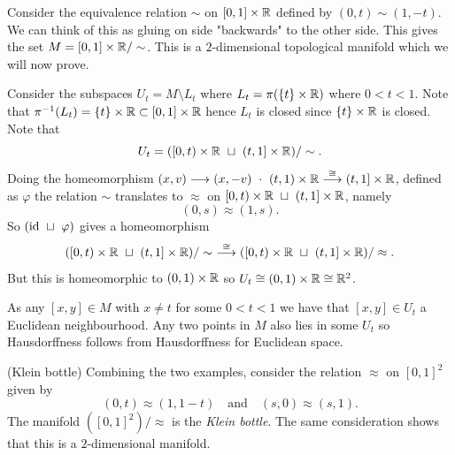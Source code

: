 \documentclass{article}
\begin{document}
\begin{example}
	Consider the equivalence relation $ \sim $ on $ [0,1]\times \mathbb{R} $ defined by $ (0,t)\sim(1,-t) $. We can think of this as gluing on side "backwards" to the other side. This gives the set $ M = [0,1]\times \mathbb{R}/\sim $. This is a $ 2 $-dimensional topological manifold which we will now prove.\par
	Consider the subspaces $ U_t = M\setminus L_t $ where $ L_t = \pi(\{t\}\times \mathbb{R}) $ where $ 0<t<1 $. Note that $ {\pi}^{-1}(L_t)=\{t\}\times \mathbb{R} \subset [0,1]\times \mathbb{R} $ hence $ L_t $ is closed since $ \{t\} \times \mathbb{R} $ is closed. Note that 
	\[U_t = ([0,t) \times \R\ \sqcup\ (t,1]\times \R)/\sim .
	\]
	Doing the homeomorphism $ (x,v)\longrightarrow (x,-v)\ \cdot \  (t,1)\times \mathbb{R}\overset{\cong}{\longrightarrow} (t,1] \times \mathbb{R} $, defined as $ \varphi $ the relation $ \sim $ translates to $ \approx $ on $ [0,t)\times \mathbb{R} \ \sqcup \ (t,1] \times \mathbb{R} $, namely
	\[
		(0,s)\approx(1,s).
	\]
	So $ (\mathrm{id} \ \sqcup \ \varphi) $ gives a homeomorphism
	\[
		([0,t) \times \R \ \sqcup \ (t,1] \times \R)/\sim \ \overset{\cong}{\longrightarrow} ([0,t) \times \R \ \sqcup \ (t,1] \times \R)/\approx.
	\]
But this is homeomorphic to $ (0,1)\times \mathbb{R} $ so $ U_t\cong (0,1)\times \mathbb{R} \cong \mathbb{R}^2 $.\par
As any $ [x,y] \in M $ with $ x\ne t $ for some $ 0<t<1 $ we have that $ [x,y]\in U_t $ a Euclidean neighbourhood. Any two points in $ M $ also lies in some $ U_t $ so Hausdorffness follows from Hausdorffness for Euclidean space.
\end{example}
\begin{example}
	(Klein bottle) Combining the two examples, consider the relation $ \approx $ on $ [0,1]^2 $ given by
	\[
		(0,t)\approx (1,1-t)\quad \text{and}\quad (s,0)\approx (s,1).
	\]
	The manifold $ ([0,1]^2)/\approx $ is the \textit{Klein bottle}. The same consideration shows that this is a $ 2 $-dimensional manifold.
\end{example}
\end{document}

